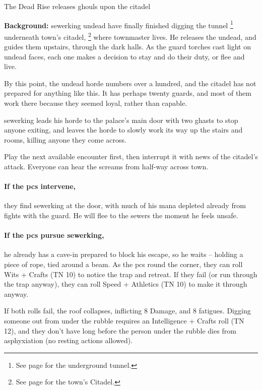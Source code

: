 {The Dead Rise}%
{ releases ghouls upon the citadel}%

\textbf{Background:}
\Gls{sewerking} undead have finally finished digging the tunnel
\footnote{See page \pageref{citadelTunnel} for the underground tunnel.}
underneath \gls{town}'s citadel,
\footnote{See page \pageref{citadel} for the town's Citadel.}
where \gls{townmaster} lives.
He releases the undead, and guides them upstairs, through the dark halls.
As the \gls{guard} torches cast light on undead faces, each one makes a decision to stay and do their duty, or flee and live.

By this point, the undead horde numbers over a hundred, and the citadel has not prepared for anything like this.
It has perhaps twenty guards, and most of them work there because they seemed loyal, rather than capable.

\Gls{sewerking} leads his horde to the palace's main door with two ghasts to stop anyone exiting, and leaves the horde to slowly work its way up the stairs and rooms, killing anyone they come across.

Play the next available encounter first, then interrupt it with news of the citadel's attack.
Everyone can hear the screams from half-way across \gls{town}.

\paragraph{If the \glspl{pc} intervene,}
they find \gls{sewerking} at the door, with much of his mana depleted already from fights with the guard.
He will flee to the sewers the moment he feels unsafe.

\ghast

\ghast

\sewerking


\paragraph{If the \glspl{pc} pursue \gls{sewerking},}
he already has a cave-in prepared to block his escape, so he waits -- holding a piece of rope, tied around a beam.
As the \glspl{pc} round the corner, they can roll Wits + Crafts (TN 10) to notice the trap and retreat.
If they fail (or run through the trap anyway), they can roll Speed + Athletics (TN 10) to make it through anyway.

If both rolls fail, the roof collapses, inflicting 8 Damage, and 8 \glspl{fatigue}.
Digging someone out from under the rubble requires an Intelligence + Crafts roll (TN 12), and they don't have long before the person under the rubble dies from asphyxiation (no resting actions allowed).

